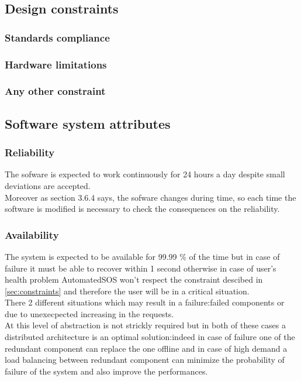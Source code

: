   \subsection{Design constraints}
    \subsubsection{Standards compliance}
    \subsubsection{Hardware limitations}
    \subsubsection{Any other constraint}
  \subsection{Software system attributes}
    \subsubsection{Reliability}
The sofware is expected to work continuously for 24 hours a day despite small deviations are accepted. \\
Moreover as section 3.6.4 says, the sofware changes during time, so each time the software is modified is necessary to check the consequences on the reliability.

    \subsubsection{Availability}
The system is expected to be available for 99.99 \% of the time but in case of failure it must be able to recover within 1 second otherwise in case of user's health problem AutomatedSOS won't respect the constraint descibed in \ref{sec:constraints} and therefore the user will be in a critical situation.\\ There 2 different situations which may result in a failure:failed components or due to unexecpected increasing in the requests. \\At this level of abstraction is not strickly required but in both of these cases a distributed architecture is an optimal solution:indeed in case of failure one of the redundant component can replace the one offline and in case of high demand a load balancing between redundant component can minimize the probability of failure of the system and also improve the performances.

